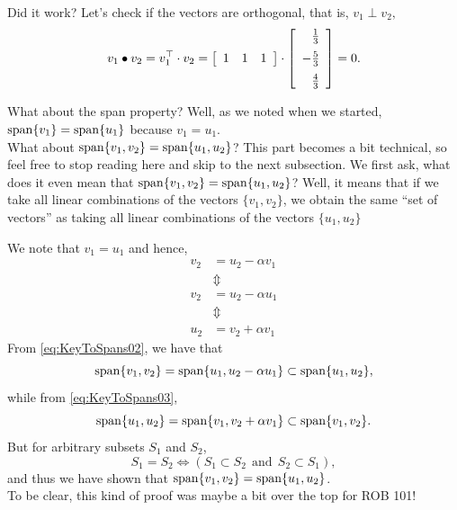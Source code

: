 Did it work? Let's check if the vectors are orthogonal, that is, $v_1 \perp v_2,$
$$v_1 \bullet v_2 = v_1 ^\top \cdot v_2 =  \left[\begin{array}{ccc}  1 & 1  & 1\end{array} \right] \cdot \left[\begin{array}{r}  \frac{1}{3} \medskip \\ -\frac{5}{3} \medskip \\\frac{4}{3} \end{array} \right] = 0.$$

What about the span property? Well, as we noted when we started, $\mathrm{span} \{ v_1 \} = \mathrm{span} \{ u_1 \}$ because $v_1 = u_1$.\\

What about $\mathrm{span} \{ v_1,v_2 \}=\mathrm{span} \{ u_1,u_2 \}$? This part becomes a bit technical, so feel free to stop reading here and skip to the next subsection. We first ask, what does it even mean that $\mathrm{span} \{ v_1,v_2 \}=\mathrm{span} \{ u_1,u_2 \}$? Well, it means that if we take all linear combinations of the vectors $\{ v_1, v_2 \}$, we obtain the same ``set of vectors'' as taking  all linear combinations of the vectors $\{ u_1, u_2 \}$

We note that $v_1 = u_1$ and hence,
\begin{align}
    \label{eq:KeyToSpans01}
        v_2 &= u_2 -\alpha v_1 \\
    & \Updownarrow \nonumber \\
      \label{eq:KeyToSpans02}
    v_2 &= u_2 -\alpha u_1 \\
    & \Updownarrow \nonumber \\
      \label{eq:KeyToSpans03}
    u_2 &= v_2 +\alpha v_1 
\end{align}
From \eqref{eq:KeyToSpans02}, we have that 
$$\mathrm{span} \{ v_1, v_2 \} = \mathrm{span} \{ u_1,u_2 -\alpha u_1 \} \subset \mathrm{span} \{ u_1,u_2 \},$$
while from \eqref{eq:KeyToSpans03},
$$\mathrm{span} \{ u_1, u_2 \} = \mathrm{span} \{ v_1,v_2 +\alpha v_1 \} \subset \mathrm{span} \{ v_1,v_2 \}.$$
But for arbitrary subsets $S_1$ and $S_2$,
$$S_1 = S_2 \iff \left(S_1 \subset S_2~~\text{and}~~S_2 \subset S_1 \right) ,$$
and thus we have shown that $\mathrm{span} \{ v_1, v_2 \} = \mathrm{span} \{ u_1,u_2 \}$.\\

To be clear, this kind of proof was maybe a bit over the top for ROB 101! 
\Qed


